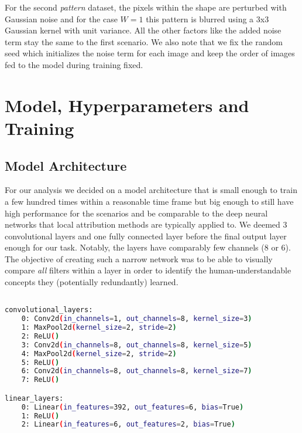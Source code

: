 For the second \textit{pattern} dataset, the pixels within the shape are perturbed with Gaussian noise and for the case $W=1$ this pattern is blurred using a 3x3 Gaussian kernel with unit variance. All the other factors like the added noise term stay the same to the first scenario. We also note that we fix the random seed which initializes the noise term for each image and keep the order of images fed to the model during training fixed. 


\section{Model, Hyperparameters and Training}\label{appendix:model}
\subsection{Model Architecture}
For our analysis we decided on a model architecture that is small enough to train a few hundred times within a reasonable time frame but big enough to still have high performance for the scenarios and be comparable to the deep neural networks that local attribution methods are typically applied to.
We deemed 3 convolutional layers and one fully connected layer before the final output layer enough for our task. Notably, the layers have comparably few channels (8 or 6). The objective of creating such a narrow network was to be able to visually compare \textit{all} filters within a layer in order to identify the human-understandable concepts they (potentially redundantly) learned. 

\begin{lstlisting}[language=bash, label=lst:cnnmodel]

convolutional_layers: 
    0: Conv2d(in_channels=1, out_channels=8, kernel_size=3)
    1: MaxPool2d(kernel_size=2, stride=2)
    2: ReLU()
    3: Conv2d(in_channels=8, out_channels=8, kernel_size=5)
    4: MaxPool2d(kernel_size=2, stride=2)
    5: ReLU()
    6: Conv2d(in_channels=8, out_channels=8, kernel_size=7)
    7: ReLU()

linear_layers:
    0: Linear(in_features=392, out_features=6, bias=True)
    1: ReLU()
    2: Linear(in_features=6, out_features=2, bias=True)  

\end{lstlisting}

